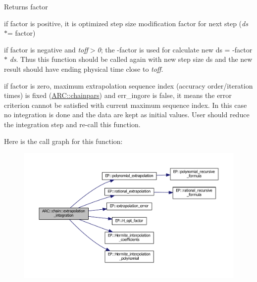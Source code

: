 \begin{DoxyReturn}{Returns}
factor
\begin{DoxyItemize}
\item if factor is positive, it is optimized step size modification factor for next step ({\itshape ds} $\ast$= factor)
\item if factor is negative and {\itshape toff$>$0}; the -\/factor is used for calculate new ds\textquotesingle{} = -\/factor $\ast$ {\itshape ds}. Thus this function should be called again with new step size ds\textquotesingle{} and the new result should have ending physical time close to {\itshape toff}.
\item if factor is zero, maximum extrapolation sequence index (accuracy order/iteration times) is fixed (\hyperlink{classARC_1_1chainpars}{A\+R\+C\+::chainpars}) and err\+\_\+ingore is false, it means the error criterion cannot be satisfied with current maximum sequence index. In this case no integration is done and the data are kept as initial values. User should reduce the integration step and re-\/call this function. 
\end{DoxyItemize}
\end{DoxyReturn}
Here is the call graph for this function\+:
\nopagebreak
\begin{figure}[H]
\begin{center}
\leavevmode
\includegraphics[width=350pt]{classARC_1_1chain_acd19e23d46d38d66c5eb60a2e9afe727_cgraph}
\end{center}
\end{figure}
\hypertarget{classARC_1_1chain_ad5bbd543b79f0f2f3180d3a1b95914b9}{}\label{classARC_1_1chain_ad5bbd543b79f0f2f3180d3a1b95914b9} 
